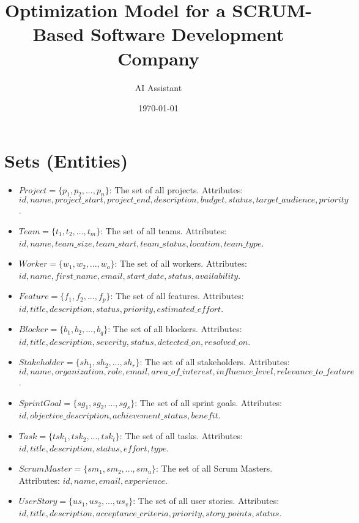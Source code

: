 \documentclass[11pt]{article}
\title{Optimization Model for a SCRUM-Based Software Development Company}
\author{AI Assistant}
\date{\today}
\begin{document}
\maketitle
\tableofcontents
\newpage

\section{Sets (Entities)}
\begin{itemize}
    \item $Project = \{p_1, p_2, ..., p_n\}$: The set of all projects. Attributes: $id, name, project\_start, project\_end, description, budget, status, target\_audience, priority$.
    \item $Team = \{t_1, t_2, ..., t_m\}$: The set of all teams. Attributes: $id, name, team\_size, team\_start, team\_status, location, team\_type$.
    \item $Worker = \{w_1, w_2, ..., w_o\}$: The set of all workers. Attributes: $id, name, first\_name, email, start\_date, status, availability$.
    \item $Feature = \{f_1, f_2, ..., f_p\}$: The set of all features. Attributes: $id, title, description, status, priority, estimated\_effort$.
    \item $Blocker = \{b_1, b_2, ..., b_q\}$: The set of all blockers. Attributes: $id, title, description, severity, status, detected\_on, resolved\_on$.
    \item $Stakeholder = \{sh_1, sh_2, ..., sh_r\}$: The set of all stakeholders. Attributes: $id, name, organization, role, email, area\_of\_interest, influence\_level, relevance\_to\_feature$.
    \item $SprintGoal = \{sg_1, sg_2, ..., sg_s\}$: The set of all sprint goals. Attributes: $id, objective\_description, achievement\_status, benefit$.
    \item $Task = \{tsk_1, tsk_2, ..., tsk_t\}$: The set of all tasks. Attributes: $id, title, description, status, effort, type$.
    \item $ScrumMaster = \{sm_1, sm_2, ..., sm_u\}$: The set of all Scrum Masters. Attributes: $id, name, email, experience$.
    \item $UserStory = \{us_1, us_2, ..., us_v\}$: The set of all user stories. Attributes: $id, title, description, acceptance\_criteria, priority, story\_points, status$.
\end{itemize}
\end{document}
